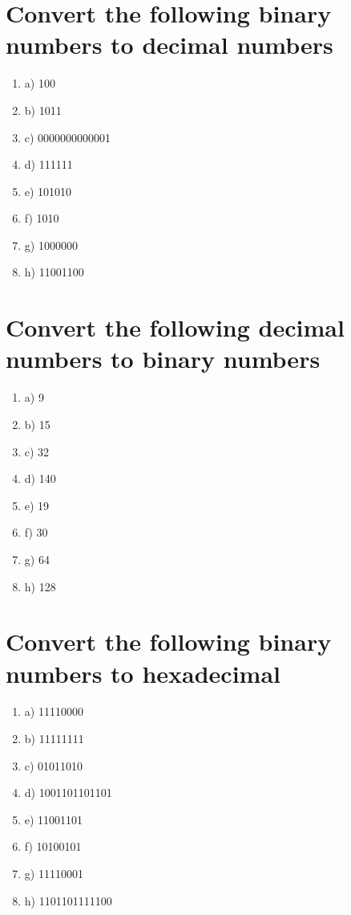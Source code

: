 \documentclass[11pt,a4paper]{article}
\begin{document}
\section{Convert the following binary numbers to decimal numbers}
\begin{enumerate}
	\item a) 100
	\item b) 1011
	\item c) 0000000000001
	\item d) 111111
	\item e) 101010
	\item f) 1010
	\item g) 1000000
	\item h) 11001100
\end{enumerate}

\section{Convert the following decimal numbers to binary numbers}
\begin{enumerate}
	\item a) 9
	\item b) 15
	\item c) 32
	\item d) 140
	\item e) 19
	\item f) 30
	\item g) 64
	\item h) 128
\end{enumerate}

\section{Convert the following binary numbers to hexadecimal}
\begin{enumerate}
	\item a) 11110000
	\item b) 11111111
	\item c) 01011010
	\item d) 1001101101101
	\item e) 11001101
	\item f) 10100101
	\item g) 11110001
	\item h) 1101101111100
\end{enumerate}
\end{document}
